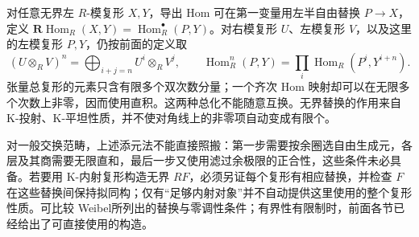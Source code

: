 \ProseParagraphBreak
对任意无界左 \(R\)-模复形 \(X,Y\)，导出 Hom 可在第一变量用左半自由替换 \(P\to X\)，定义 \(\mathbf R\operatorname{Hom}_R(X,Y)=\operatorname{Hom}_R^\bullet(P,Y)\)。对右模复形 \(U\)、左模复形 \(V\)，以及这里的左模复形 \(P,Y\)，仍按前面的定义取
\[
	(U\otimes_RV)^n=\bigoplus_{i+j=n}U^i\otimes_RV^j, \qquad \operatorname{Hom}_R^n(P,Y)=\prod_i\operatorname{Hom}_R(P^i,Y^{i+n}).
\]
张量总复形的元素只含有限多个双次数分量；一个齐次 Hom 映射却可以在无限多个次数上非零，因而使用直积。这两种总化不能随意互换。无界替换的作用来自 K-投射、K-平坦性质，并不使对角线上的非零项自动变成有限个。

\ProseParagraphBreak
对一般交换范畴，上述添元法不能直接照搬：第一步需要按余圈选自由生成元，各层及其商需要无限直和，最后一步又使用滤过余极限的正合性，这些条件未必具备。若要用 K-内射复形构造无界 \(RF\)，必须另证每个复形有相应替换，并检查 \(F\) 在这些替换间保持拟同构；仅有“足够内射对象”并不自动提供这里使用的整个复形性质。可比较 Weibel\cite[Generalized Existence Theorem 10.5.9]{Weibel1994HomologicalAlgebra}所列出的替换与零调性条件；有界性有限制时，前面各节已经给出了可直接使用的构造。

